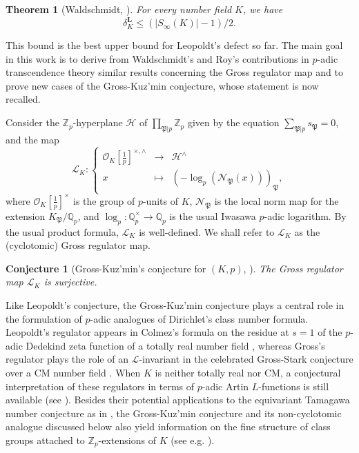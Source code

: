 \documentclass[12pt]{amsart}
\newcommand{\Q}{\mathbb{Q}}
\newcommand\Zp{{\mathbb{Z}_p}}
\newcommand\Qp{{\mathbb{Q}_p}}
\newcommand\cL{\mathcal{L}}
\newcommand\cH{\mathcal{H}}
\newcommand\cN{\mathcal{N}}
\newcommand\cO{\mathcal{O}}
\newcommand\gP{\mathfrak{P}}
\newcommand\sL{\mathscr{L}}
\theoremstyle{defstyle}
\theoremstyle{thmstyle}
\newtheorem{THM}[subsection]{Theorem}
\newtheorem{CONJ}[subsection]{Conjecture}
\begin{document}
	
	\begin{THM}[Waldschmidt, \cite{waldschmidt}]\label{thm:waldschmidt_bound}
		For every number field $K$, we have
		\[\delta^\textbf{L}_K\leq (|S_\infty(K)|-1)/2.\]
	\end{THM}

	This bound is the best upper bound for Leopoldt's defect so far. 
	The main goal in this work is to derive from Waldschmidt's and Roy's contributions in $p$-adic transcendence theory similar results concerning the Gross regulator map and to prove new cases of the Gross-Kuz'min conjecture, whose statement is now recalled.
	
	Consider the $\Zp$-hyperplane $\cH $ of $\prod_{\gP|p} \Zp$ given by the equation $\sum_{\gP|p}s_\gP =0$, and the map
	\begin{equation}\label{eq:def_sL_gross}
		\sL_K \colon \left\{\begin{array}{ccl}
			\cO_K[\tfrac{1}{p}]^{\times,\wedge} & \longrightarrow & \cH^\wedge \\
			x & \mapsto & (-\log_p(\cN_{\gP}(x)))_\gP,
		\end{array}\right.
	\end{equation}
	where $\cO_K[\tfrac{1}{p}]^\times$ is the group of $p$-units of $K$, $\cN_{\gP}$ is the local norm map for the extension $K_\gP/\Qp$, and $\log_p:\Q_p^\times \to \Qp$ is the usual Iwasawa $p$-adic logarithm. By the usual
	product formula, $\sL_K$ is well-defined. We shall refer to $\sL_K$ as the (cyclotomic) Gross regulator map.
	
	\begin{CONJ}[Gross-Kuz'min's conjecture for $(K,p)$, \cite{gross1981padic,kuzmin}]
		The Gross regulator map $\sL_K$ is surjective.
	\end{CONJ}

	Like Leopoldt's conjecture, the Gross-Kuz'min conjecture plays a central role in the formulation of $p$-adic analogues of Dirichlet's class number formula. Leopoldt's regulator appears in Colmez's formula on the residue at $s=1$ of the $p$-adic Dedekind zeta function of a totally real number field \cite{colmezleopoldt}, whereas Gross's regulator plays the role of an $\cL$-invariant in the celebrated Gross-Stark conjecture over a CM number field \cite{gross1981padic}. When $K$ is neither totally real nor CM, a conjectural interpretation of these regulators in terms of $p$-adic Artin $L$-functions is still available (see \cite{hIMC}). Besides their potential applications to the equivariant Tamagawa number conjecture as in \cite{BKSANT}, the Gross-Kuz'min conjecture and its non-cyclotomic analogue discussed below also yield information on the fine structure of class groups attached to $\Zp$-extensions of $K$ (see e.g. \cite{federergross,kolster,nguyenquangdocapitulation,jaulent2017}).
	
\end{document}
